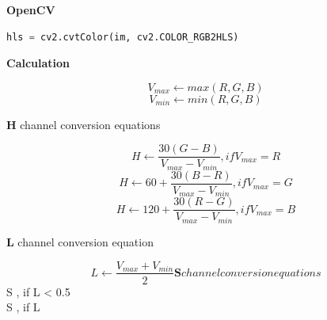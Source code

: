 \documentclass[12pt]{article}
\begin{document}
\textbf{OpenCV}

\begin{lstlisting}[language=Python]
hls = cv2.cvtColor(im, cv2.COLOR_RGB2HLS)
\end{lstlisting}

\textbf{Calculation}

$$V_{max} \leftarrow max(R, G, B)$$
$$V_{min} \leftarrow min(R, G, B)$$

\textbf{H} channel conversion equations

$$H \leftarrow \frac{30(G-B)}{V_{max}-V_{min}}, if V_{max} = R$$
$$H \leftarrow 60 + \frac{30(B-R)}{V_{max}-V_{min}}, if V_{max} = G$$
$$H \leftarrow 120 + \frac{30(R-G)}{V_{max}-V_{min}}, if V_{max} = B$$

\textbf{L} channel conversion equation

$$L \leftarrow \frac{V_{max} + V_{min}}{2}

\textbf{S} channel conversion equations

$$S \leftarrow {}, if L < 0.5$$
$$S \leftarrow {}, if L $$
\end{document}
